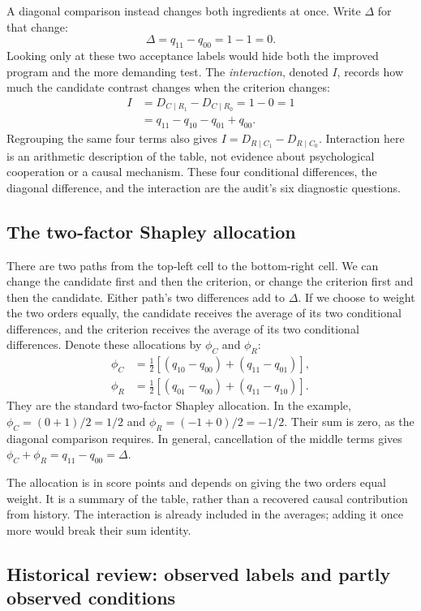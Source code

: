 A diagonal comparison instead changes both ingredients at once. Write
$\Delta$ for that change:
\[
\Delta=q_{11}-q_{00}=1-1=0.
\]
Looking only at these two acceptance labels would hide both the improved
program and the more demanding test. The \emph{interaction}, denoted $I$,
records how much the candidate contrast changes when the criterion changes:
\begin{align*}
I&=D_{C\mid R_1}-D_{C\mid R_0}=1-0=1\\
 &=q_{11}-q_{10}-q_{01}+q_{00}.
\end{align*}
Regrouping the same four terms also gives
$I=D_{R\mid C_1}-D_{R\mid C_0}$. Interaction here is an arithmetic
description of the table, not evidence about psychological cooperation or
a causal mechanism. These four conditional differences, the diagonal
difference, and the interaction are the audit's six diagnostic questions.

\subsection{The two-factor Shapley allocation}
\label{subsec:allocation}

There are two paths from the top-left cell to the bottom-right cell. We can
change the candidate first and then the criterion, or change the criterion
first and then the candidate. Either path's two differences add to $\Delta$.
If we choose to weight the two orders equally, the candidate receives the
average of its two conditional differences, and the criterion receives the
average of its two conditional differences. Denote these allocations by
$\phi_C$ and $\phi_R$:
\begin{align*}
\phi_C&=\tfrac12[(q_{10}-q_{00})+(q_{11}-q_{01})],\\
\phi_R&=\tfrac12[(q_{01}-q_{00})+(q_{11}-q_{10})].
\end{align*}
They are the standard two-factor Shapley allocation. \cite{shapley} In the
example, $\phi_C=(0+1)/2=1/2$ and $\phi_R=(-1+0)/2=-1/2$. Their sum is zero,
as the diagonal comparison requires. In general, cancellation of the middle
terms gives $\phi_C+\phi_R=q_{11}-q_{00}=\Delta$.

The allocation is in score points and depends on giving the two orders equal weight. It is a summary of the table, rather than a recovered causal contribution from history. The interaction is already included in the averages; adding it once more would break their sum identity.

\subsection{Historical review: observed labels and partly observed conditions}
\label{subsec:historical-model}

